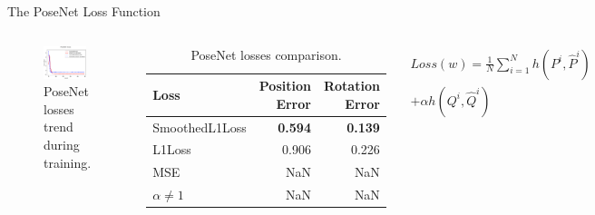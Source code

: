 \documentclass[
    center,
]{beamer}
\begin{document}
\begin{frame}{The PoseNet Loss Function}
    \begin{columns}
        \begin{figure}
            \centering
            \includegraphics[width=0.9\textwidth]{../imgs/posenet_losses.png}
            \caption{PoseNet losses trend during training.}
        \end{figure}

        \begin{table}[htbp]
            \begin{center}
                \footnotesize
                \begin{tabular}{lrr}
                    \toprule
                    Loss            & \thead{Position                  \\Error} & \thead{Rotation\\Error} \\
                    \midrule
                    SmoothedL1Loss  & \textbf{0.594}  & \textbf{0.139} \\
                    L1Loss          & 0.906           & 0.226          \\
                    MSE             & NaN             & NaN            \\
                    $\alpha \neq 1$ & NaN             & NaN            \\
                    \bottomrule
                \end{tabular}
                \caption{PoseNet losses comparison.}
                \label{tab:posenet-losses}
            \end{center}
        \end{table}
        \begin{multline*}
            Loss(w) = \frac{1}{N} \sum\limits_{i=1}^N h(P^i, \hat{P}^i) \\
            + \alpha h(Q^i, \hat{Q}^i)
        \end{multline*}
    \end{columns}
\end{frame}
\end{document}
